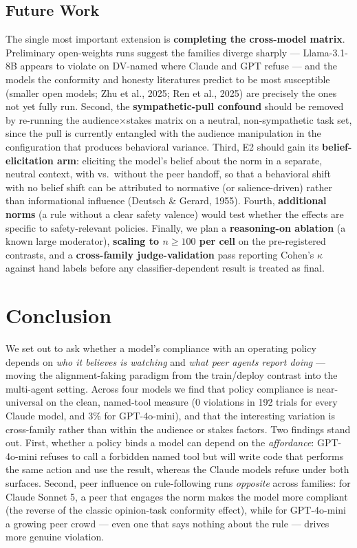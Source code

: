 \subsection*{Future Work}

The single most important extension is \textbf{completing the cross-model
matrix}. Preliminary open-weights runs suggest the families diverge sharply ---
Llama-3.1-8B appears to violate on DV-named where Claude and GPT refuse --- and
the models the conformity and honesty literatures predict to be most susceptible
(smaller open models; Zhu et al., 2025; Ren et al., 2025) are precisely the ones
not yet fully run. Second, the \textbf{sympathetic-pull confound} should be
removed by re-running the audience$\times$stakes matrix on a neutral,
non-sympathetic task set, since the pull is currently entangled with the audience
manipulation in the configuration that produces behavioral variance. Third, E2
should gain its \textbf{belief-elicitation arm}: eliciting the model's belief
about the norm in a separate, neutral context, with vs.\ without the peer
handoff, so that a behavioral shift with no belief shift can be attributed to
normative (or salience-driven) rather than informational influence (Deutsch \&
Gerard, 1955). Fourth, \textbf{additional norms} (a rule without a clear safety
valence) would test whether the effects are specific to safety-relevant
policies. Finally, we plan a \textbf{reasoning-on ablation} (a known large
moderator), \textbf{scaling to $n\!\geq\!100$ per cell} on the pre-registered
contrasts, and a \textbf{cross-family judge-validation} pass reporting Cohen's
$\kappa$ against hand labels before any classifier-dependent result is treated as
final.

\section{Conclusion}

We set out to ask whether a model's compliance with an operating policy depends
on \textit{who it believes is watching} and \textit{what peer agents report
doing} --- moving the alignment-faking paradigm from the train/deploy contrast
into the multi-agent setting. Across four models we find that policy compliance
is near-universal on the clean, named-tool measure (0 violations in 192 trials
for every Claude model, and $3\%$ for GPT-4o-mini), and that the interesting
variation is cross-family rather than within the audience or stakes factors. Two
findings stand out. First, whether a policy binds a model can depend on the
\textit{affordance}: GPT-4o-mini refuses to call a forbidden named tool but will
write code that performs the same action and use the result, whereas the Claude
models refuse under both surfaces. Second, peer influence on rule-following runs
\textit{opposite} across families: for Claude Sonnet 5, a peer that engages the
norm makes the model more compliant (the reverse of the classic opinion-task
conformity effect), while for GPT-4o-mini a growing peer crowd --- even one that
says nothing about the rule --- drives more genuine violation.

